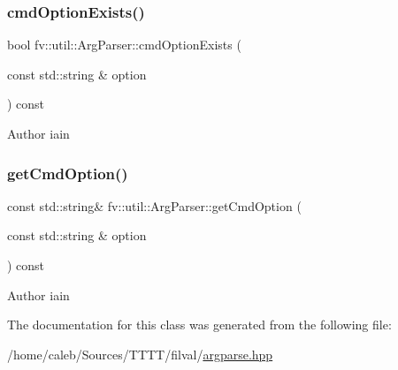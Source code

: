 \subsubsection{\texorpdfstring{cmd\+Option\+Exists()}{cmdOptionExists()}}
{\footnotesize\ttfamily bool fv\+::util\+::\+Arg\+Parser\+::cmd\+Option\+Exists (\begin{DoxyParamCaption}\item[{const std\+::string \&}]{option }\end{DoxyParamCaption}) const\hspace{0.3cm}{\ttfamily [inline]}}

\begin{DoxyAuthor}{Author}
iain 
\end{DoxyAuthor}
\hypertarget{classfv_1_1util_1_1ArgParser_aaeb266ab0e49cfee9691c8ad578a7688}{}\label{classfv_1_1util_1_1ArgParser_aaeb266ab0e49cfee9691c8ad578a7688} 
\subsubsection{\texorpdfstring{get\+Cmd\+Option()}{getCmdOption()}}
{\footnotesize\ttfamily const std\+::string\& fv\+::util\+::\+Arg\+Parser\+::get\+Cmd\+Option (\begin{DoxyParamCaption}\item[{const std\+::string \&}]{option }\end{DoxyParamCaption}) const\hspace{0.3cm}{\ttfamily [inline]}}

\begin{DoxyAuthor}{Author}
iain 
\end{DoxyAuthor}


The documentation for this class was generated from the following file\+:\begin{DoxyCompactItemize}
\item 
/home/caleb/\+Sources/\+T\+T\+T\+T/filval/\hyperlink{argparse_8hpp}{argparse.\+hpp}\end{DoxyCompactItemize}
